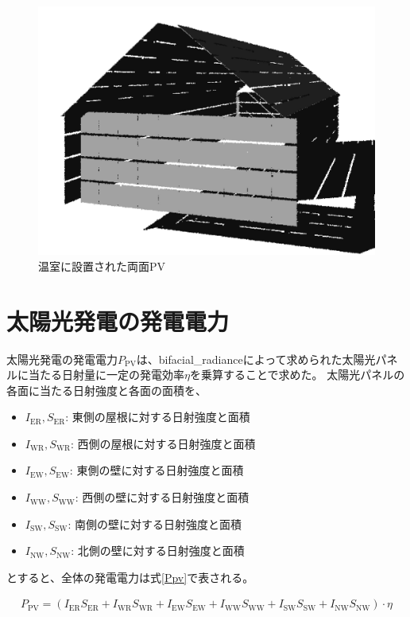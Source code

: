 \documentclass[uplatex,dvipdfmx,nomag,a4paper,oneside,onecolumn,12pt]{bxjsreport} %
\begin{document}
\begin{figure}[ht]
    \centering
    \includegraphics[width=0.9\linewidth]{fig/PVmodel.png}
    \caption{温室に設置された両面PV}
    \label{fig:bifacialPV}
\end{figure}

\section{太陽光発電の発電電力}
太陽光発電の発電電力\(P_{\text{PV}}\)は、bifacial\_radianceによって求められた太陽光パネルに当たる日射量に一定の発電効率\(\eta\)を乗算することで求めた。
太陽光パネルの各面に当たる日射強度と各面の面積を、
\begin{itemize}
    \item \(I_{\text{ER}}, S_{\text{ER}}\): 東側の屋根に対する日射強度と面積
    \item \(I_{\text{WR}}, S_{\text{WR}}\): 西側の屋根に対する日射強度と面積
    \item \(I_{\text{EW}}, S_{\text{EW}}\): 東側の壁に対する日射強度と面積
    \item \(I_{\text{WW}}, S_{\text{WW}}\): 西側の壁に対する日射強度と面積
    \item \(I_{\text{SW}}, S_{\text{SW}}\): 南側の壁に対する日射強度と面積
    \item \(I_{\text{NW}}, S_{\text{NW}}\): 北側の壁に対する日射強度と面積
\end{itemize}
とすると、全体の発電電力は式\eqref{Ppv}で表される。

\begin{align}
    P_{\text{PV}} =  (I_{\text{ER}} S_{\text{ER}} + I_{\text{WR}} S_{\text{WR}} + I_{\text{EW}} S_{\text{EW}} + I_{\text{WW}} S_{\text{WW}} + I_{\text{SW}} S_{\text{SW}} + I_{\text{NW}} S_{\text{NW}}) \cdot \eta
    \label{Ppv}
\end{align}
\end{document}
